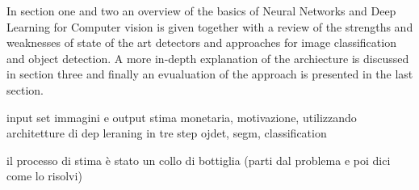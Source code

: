 In section one and two an overview of the basics of Neural Networks and Deep Learning for Computer vision is given together with a review of the strengths and weaknesses of state of the art detectors and approaches for image classification and object detection. A more in-depth explanation of the archiecture is discussed in section three and finally an evualuation of the approach is presented in the last section.




input set immagini e output stima monetaria, motivazione, utilizzando
architetture di dep leraning in tre step ojdet, segm, classification

il processo di stima è stato un collo di bottiglia (parti dal problema e poi dici come lo risolvi)






